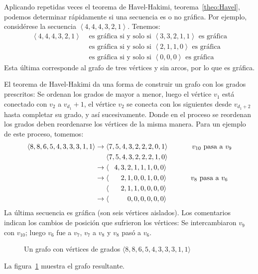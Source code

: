   Aplicando repetidas veces el teorema de Havel-Hakimi,
  teorema~\ref{theo:Havel},
  podemos determinar rápidamente si una secuencia es o no gráfica.
  Por ejemplo,
  considérese la secuencia
    \(\left\langle 4, 4, 4, 3, 2, 1 \right\rangle\).
  Tenemos:
  \begin{align*}
    \left\langle 4, 4, 4, 3, 2, 1 \right\rangle
      &\text{\ es gráfica si y solo si\ }
	 \left\langle 3, 3, 2, 1, 1 \right\rangle
	 \text{\ es gráfica} \\
      &\text{\ es gráfica si y solo si\ }
	 \left\langle 2, 1, 1, 0 \right\rangle
	 \text{\ es gráfica} \\
      &\text{\ es gráfica si y solo si\ }
	 \left\langle 0, 0, 0 \right\rangle
	 \text{\ es gráfica}
  \end{align*}
  Esta última corresponde al grafo de tres vértices y sin arcos,
  por lo que es gráfica.

  El teorema de Havel-Hakimi da una forma de construir un grafo
  con los grados prescritos:
  Se ordenan los grados de mayor a menor,
  luego el vértice \(v_1\)
  está conectado con \(v_2\) a \(v_{d_1} + 1\),
  el vértice \(v_2\)
  se conecta con los siguientes desde \(v_{d_1 + 2}\)
  hasta completar su grado,
  y así sucesivamente.
  Donde en el proceso se reordenan los grados
  deben reordenarse los vértices
  de la misma manera.
  Para un ejemplo de este proceso,
  tomemos:
  \begin{align*}
    \langle 8, 8, 6, 5, 4, 3, 3, 3, 1, 1 \rangle
      &\rightarrow \langle 7, 5, 4, 3, 2, 2, 2, 0, 1 \rangle
	 \hspace*{3.5em} \text{\(v_{10}\) pasa a \(v_9\)} \\
      &\phantom{{} \rightarrow {}}
		   \langle 7, 5, 4, 3, 2, 2, 2, 1, 0 \rangle \\
      &\rightarrow \langle \phantom{7,}
			      4, 3, 2, 1, 1, 1, 0, 0 \rangle \\
      &\rightarrow \langle \phantom{7, 4,}
				 2, 1, 0, 0, 1, 0, 0 \rangle
	 \hspace*{3.5em} \text{\(v_8\) pasa a \(v_6\)} \\
      &\phantom{{} \rightarrow {}}
		   \langle \phantom{7, 5,}
				 2, 1, 1, 0, 0, 0, 0 \rangle \\
      &\rightarrow \langle \phantom{7, 5, 4,}
				    0, 0, 0, 0, 0, 0 \rangle
  \end{align*}
  La última secuencia es gráfica
  (son seis vértices aislados).
  Los comentarios
  indican los cambios de posición que sufrieron los vértices:
  Se intercambiaron \(v_{9}\) con \(v_{10}\);
  luego \(v_6\) fue a \(v_7\),
  \(v_7\) a \(v_8\) y \(v_8\) pasó a \(v_6\).
  \begin{figure}[ht]
    \centering
    \caption{Un grafo con vértices
	     de grados $\langle 8, 8, 6, 5, 4, 3, 3, 3, 1, 1 \rangle$}
    \label{fig:ex-Havel}
  \end{figure}
  La figura~\ref{fig:ex-Havel} muestra el grafo resultante.

